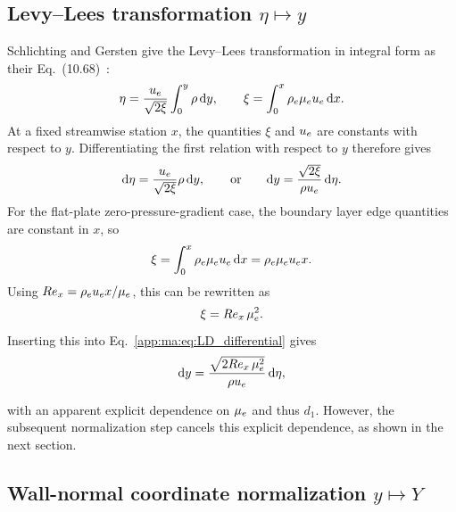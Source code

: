 \subsection{\texorpdfstring{Levy--Lees transformation \(\eta \mapsto y\)}{Levy--Lees transformation eta to y}}\label{app:ma:sec:LD_transformation}
Schlichting and Gersten give the Levy--Lees transformation in integral form as their Eq.~(10.68)~\cite{SchlichtingGersten2017BoundaryLayer}:
\begin{equation}
  \eta=\frac{u_e}{\sqrt{2\xi}}\int_0^y \rho\,\mathrm{d} y,
  \qquad
  \xi=\int_0^x \rho_e\mu_eu_e\,\mathrm{d} x.
  \label{app:ma:eq:LD_integral}
\end{equation}
At a fixed streamwise station \(x\), the quantities \(\xi\) and \(u_e\) are constants with respect to \(y\). Differentiating the first relation with respect to \(y\) therefore gives
\begin{equation}
  \mathrm{d}\eta
  =
  \frac{u_e}{\sqrt{2\xi}}\rho\,\mathrm{d} y,
  \qquad \text{or}\qquad
  \mathrm{d} y
  =
  \frac{\sqrt{2\xi}}{\rho u_e}\,\mathrm{d}\eta.
  \label{app:ma:eq:LD_differential}
\end{equation}
For the \maAppName{} flat-plate zero-pressure-gradient case, the boundary layer edge quantities are constant in \(x\), so
\begin{equation}
  \xi
  =
  \int_0^x \rho_e\mu_eu_e\,\mathrm{d} x
  =
  \rho_e\mu_eu_e x.
  \label{app:ma:eq:xi_flat_plate}
\end{equation}
Using \(Re_x=\rho_eu_e x/\mu_e\), this can be rewritten as
\begin{equation}
  \xi=Re_x\,\mu_e^2.
  \label{app:ma:eq:xi_rex}
\end{equation}
Inserting this into Eq.~\eqref{app:ma:eq:LD_differential} gives
\begin{equation}
  \mathrm{d} y
  =
  \frac{\sqrt{2Re_x\,\mu_e^2}}{\rho u_e}\,\mathrm{d} \eta,
  \label{app:ma:eq:dy_rex}
\end{equation}

with an apparent explicit dependence on \(\mu_e\) and thus \(d_1\). However, the subsequent normalization step cancels this explicit dependence, as shown in the next section.

\subsection{\texorpdfstring{Wall-normal coordinate normalization \(y \mapsto Y\)}{Wall-normal coordinate normalization y to Y}}\label{app:ma:sec:LD_normalization}

